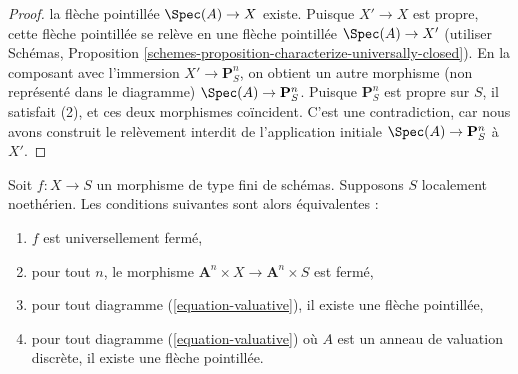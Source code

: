 \begin{proof}
la flèche pointillée $\Spec(A) \to X$ existe.
Puisque $X' \to X$ est propre, cette flèche pointillée
se relève en une flèche pointillée $\Spec(A) \to X'$ (utiliser Schémas,
Proposition \ref{schemes-proposition-characterize-universally-closed}).
En la composant avec l'immersion $X' \to \mathbf{P}^n_S$, on obtient
un autre morphisme (non représenté dans le diagramme)
$\Spec(A) \to \mathbf{P}^n_S$. Puisque $\mathbf{P}^n_S$
est propre sur $S$, il satisfait (2), et ces deux morphismes
coïncident. C'est une contradiction, car nous avons construit
le relèvement interdit de l'application initiale $\Spec(A) \to \mathbf{P}^n_S$
à $X'$.
\end{proof}

\begin{lemma}
\label{lemma-check-universally-closed-Noetherian}
Soit $f : X \to S$ un morphisme de type fini de schémas.
Supposons $S$ localement noethérien. Les conditions suivantes sont alors équivalentes :
\begin{enumerate}
\item $f$ est universellement fermé,
\item pour tout $n$, le morphisme
$\mathbf{A}^n \times X \to \mathbf{A}^n \times S$ est fermé,
\item pour tout diagramme (\ref{equation-valuative}), il existe une
flèche pointillée,
\item pour tout diagramme (\ref{equation-valuative}) où $A$ est un anneau
de valuation discrète, il existe une flèche pointillée.
\end{enumerate}
\end{lemma}

